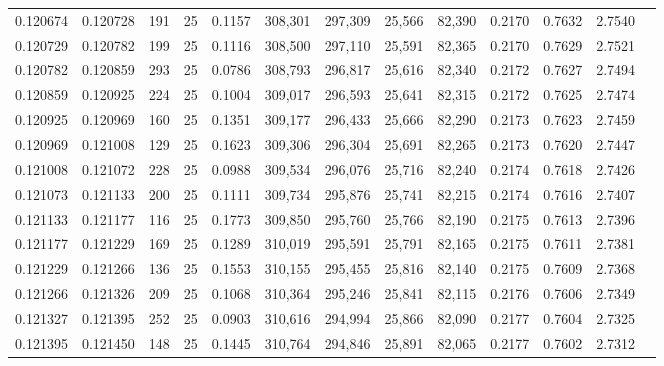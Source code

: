 \begin{tabular}{rrrrrrrrrrrrr}
0.120674 & 0.120728 &   191 &  25 &                                     0.1157 & 308,301 & 297,309 &  25,566 &  82,390 & 0.2170 & 0.7632 & 2.7540 \\
0.120729 & 0.120782 &   199 &  25 &                                     0.1116 & 308,500 & 297,110 &  25,591 &  82,365 & 0.2170 & 0.7629 & 2.7521 \\
0.120782 & 0.120859 &   293 &  25 &                                     0.0786 & 308,793 & 296,817 &  25,616 &  82,340 & 0.2172 & 0.7627 & 2.7494 \\
0.120859 & 0.120925 &   224 &  25 &                                     0.1004 & 309,017 & 296,593 &  25,641 &  82,315 & 0.2172 & 0.7625 & 2.7474 \\
0.120925 & 0.120969 &   160 &  25 &                                     0.1351 & 309,177 & 296,433 &  25,666 &  82,290 & 0.2173 & 0.7623 & 2.7459 \\
0.120969 & 0.121008 &   129 &  25 &                                     0.1623 & 309,306 & 296,304 &  25,691 &  82,265 & 0.2173 & 0.7620 & 2.7447 \\
0.121008 & 0.121072 &   228 &  25 &                                     0.0988 & 309,534 & 296,076 &  25,716 &  82,240 & 0.2174 & 0.7618 & 2.7426 \\
0.121073 & 0.121133 &   200 &  25 &                                     0.1111 & 309,734 & 295,876 &  25,741 &  82,215 & 0.2174 & 0.7616 & 2.7407 \\
0.121133 & 0.121177 &   116 &  25 &                                     0.1773 & 309,850 & 295,760 &  25,766 &  82,190 & 0.2175 & 0.7613 & 2.7396 \\
0.121177 & 0.121229 &   169 &  25 &                                     0.1289 & 310,019 & 295,591 &  25,791 &  82,165 & 0.2175 & 0.7611 & 2.7381 \\
0.121229 & 0.121266 &   136 &  25 &                                     0.1553 & 310,155 & 295,455 &  25,816 &  82,140 & 0.2175 & 0.7609 & 2.7368 \\
0.121266 & 0.121326 &   209 &  25 &                                     0.1068 & 310,364 & 295,246 &  25,841 &  82,115 & 0.2176 & 0.7606 & 2.7349 \\
0.121327 & 0.121395 &   252 &  25 &                                     0.0903 & 310,616 & 294,994 &  25,866 &  82,090 & 0.2177 & 0.7604 & 2.7325 \\
0.121395 & 0.121450 &   148 &  25 &                                     0.1445 & 310,764 & 294,846 &  25,891 &  82,065 & 0.2177 & 0.7602 & 2.7312 \\

\end{tabular}
